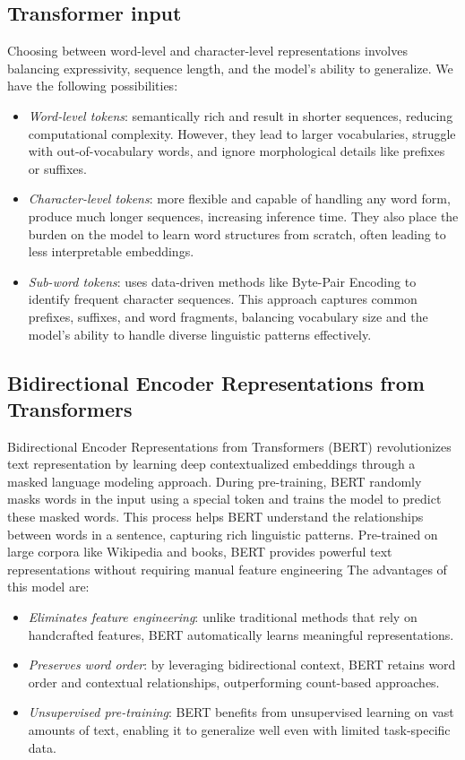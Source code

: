 \subsection{Transformer input}
Choosing between word-level and character-level representations involves balancing expressivity, sequence length, and the model's ability to generalize.
We have the following possibilities: 
\begin{itemize}
    \item \textit{Word-level tokens}: semantically rich and result in shorter sequences, reducing computational complexity. 
        However, they lead to larger vocabularies, struggle with out-of-vocabulary words, and ignore morphological details like prefixes or suffixes.
    \item \textit{Character-level tokens}: more flexible and capable of handling any word form, produce much longer sequences, increasing inference time.
        They also place the burden on the model to learn word structures from scratch, often leading to less interpretable embeddings.
    \item \textit{Sub-word tokens}: uses data-driven methods like Byte-Pair Encoding to identify frequent character sequences. 
    This approach captures common prefixes, suffixes, and word fragments, balancing vocabulary size and the model's ability to handle diverse linguistic patterns effectively.
\end{itemize}

\subsection{Bidirectional Encoder Representations from Transformers}
Bidirectional Encoder Representations from Transformers (BERT) revolutionizes text representation by learning deep contextualized embeddings through a masked language modeling approach.
During pre-training, BERT randomly masks words in the input using a special token and trains the model to predict these masked words.
This process helps BERT understand the relationships between words in a sentence, capturing rich linguistic patterns. 
Pre-trained on large corpora like Wikipedia and books, BERT provides powerful text representations without requiring manual feature engineering
The advantages of this model are: 
\begin{itemize}
    \item \textit{Eliminates feature engineering}: unlike traditional methods that rely on handcrafted features, BERT automatically learns meaningful representations.
    \item \textit{Preserves word order}: by leveraging bidirectional context, BERT retains word order and contextual relationships, outperforming count-based approaches.
    \item \textit{Unsupervised pre-training}: BERT benefits from unsupervised learning on vast amounts of text, enabling it to generalize well even with limited task-specific data.
\end{itemize}

